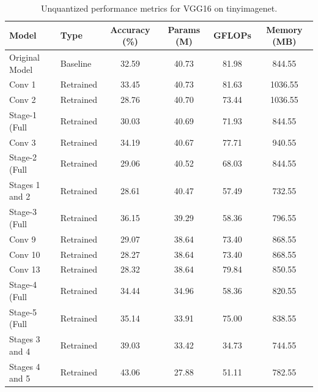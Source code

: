 \begin{table}
\caption{Unquantized performance metrics for VGG16 on tinyimagenet.}
\label{tab:VGG16_tinyimagenet_unquant}
\begin{tabular}{llcccc}
\toprule
Model & Type & Accuracy (\%) & Params (M) & GFLOPs & Memory (MB) \\
\midrule
Original Model & Baseline & 32.59 & 40.73 & 81.98 & 844.55 \\
Conv 1 & Retrained & 33.45 & 40.73 & 81.63 & 1036.55 \\
Conv 2 & Retrained & 28.76 & 40.70 & 73.44 & 1036.55 \\
Stage-1 (Full & Retrained & 30.03 & 40.69 & 71.93 & 844.55 \\
Conv 3 & Retrained & 34.19 & 40.67 & 77.71 & 940.55 \\
Stage-2 (Full & Retrained & 29.06 & 40.52 & 68.03 & 844.55 \\
Stages 1 and 2 & Retrained & 28.61 & 40.47 & 57.49 & 732.55 \\
Stage-3 (Full & Retrained & 36.15 & 39.29 & 58.36 & 796.55 \\
Conv 9 & Retrained & 29.07 & 38.64 & 73.40 & 868.55 \\
Conv 10 & Retrained & 28.27 & 38.64 & 73.40 & 868.55 \\
Conv 13 & Retrained & 28.32 & 38.64 & 79.84 & 850.55 \\
Stage-4 (Full & Retrained & 34.44 & 34.96 & 58.36 & 820.55 \\
Stage-5 (Full & Retrained & 35.14 & 33.91 & 75.00 & 838.55 \\
Stages 3 and 4 & Retrained & 39.03 & 33.42 & 34.73 & 744.55 \\
Stages 4 and 5 & Retrained & 43.06 & 27.88 & 51.11 & 782.55 \\
\bottomrule
\end{tabular}
\end{table}
